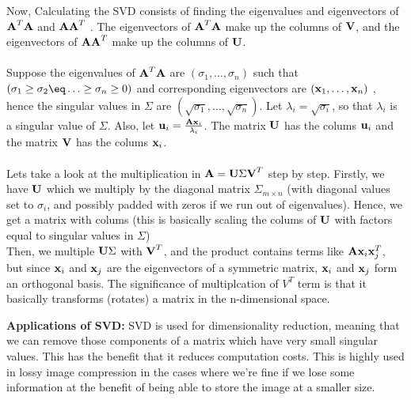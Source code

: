 \documentclass[12pt, a4paper]{article}
\begin{document}
Now, Calculating the SVD consists of finding the eigenvalues and eigenvectors of $\textbf{A}^T\textbf{A}$ and $\textbf{A}\textbf{A}^T$ .
The eigenvectors of $\textbf{A}^T\textbf{A}$ make up the columns of $\textbf{V}$, and the eigenvectors of $\textbf{A}\textbf{A}^T$  make up the columns of $\textbf{U}$. \\ \\
Suppose the eigenvalues of $\textbf{A}^T\textbf{A}$ are $(\sigma_1, \ldots , \sigma_n)$ such that $(\sigma_1 \geq \sigma_2 \eq \ldots \geq \sigma_n \geq 0)$ and corresponding eigenvectors are $(\textbf{x}_1, \ldots , \textbf{x}_n)$ , hence the singular values in $\Sigma$ are $(\sqrt{\sigma_1}, \ldots , \sqrt{\sigma_n})$. Let $\lambda_i = \sqrt{\sigma_i}$, so that $\lambda_i$ is a singular value of $\Sigma$. Also, let $\textbf{u}_i = \frac{\textbf{A}\textbf{x}_i}{\lambda_i}$. The matrix $\textbf{U}$ has the colums $\textbf{u}_i$ and the matrix $\textbf{V}$ has the colums $\textbf{x}_i$. \\ \\
Lets take a look at the multiplication in $\textbf{A} = \textbf{U}\Sigma\textbf{V}^T$ step by step.
Firstly, we have $\textbf{U}$ which we multiply by the diagonal matrix $\Sigma_{m \times n}$ (with diagonal values set to $\sigma_i$, and possibly padded with zeros if we run out of eigenvalues). Hence, we get a matrix with colums (this is basically scaling the colums of $\textbf{U}$ with factors equal to singular values in $\Sigma$) \\

Then, we multiple $\textbf{U}\Sigma$ with $\textbf{V}^T$, and the product contains terms like $\textbf{A} \textbf{x}_i \textbf{x}^T_j$, but since $\textbf{x}_i$ and $\textbf{x}_j$ are the eigenvectors of a symmetric matrix, $\textbf{x}_i$ and $\textbf{x}_j$ form an orthogonal basis.
The significance of multiplcation of $V^T$ term is that it basically transforms (rotates) a matrix in the n-dimensional space.

\textbf{Applications of SVD:} SVD is used for dimensionality reduction, meaning that we can remove those components of a matrix which have very small singular values. This has the benefit that it reduces computation costs. This is highly used in lossy image compression in the cases where we're fine if we lose some information at the benefit of being able to store the image at a smaller size.
\end{document}
